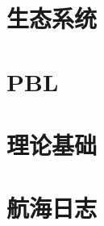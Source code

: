 \documentclass[UTF8,oneside]{ctexbook}
\begin{document}




\part{生态系统}






%
%
%

\part{PBL}




\part{理论基础}














% 











\part{航海日志}













\end{document}
